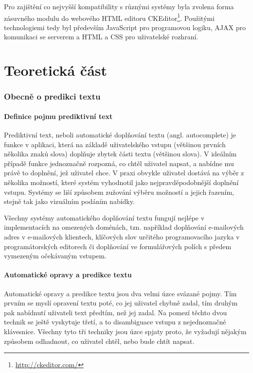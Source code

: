\documentclass[a4paper,11pt]{article}
\begin{document}
Pro zajištění co nejvyšší kompatibility s různými systémy byla zvolena forma zásuvného modulu do webového HTML editoru CKEditor\footnote{\url{http://ckeditor.com/}}. Použitými technologiemi tedy byl především JavaScript pro programovou logiku, AJAX pro komunikaci se serverem a HTML a CSS pro uživatelské rozhraní.

\newpage

\part{Teoretická část}

\section{Obecně o predikci textu}

\subsection{Definice pojmu prediktivní text}

Prediktivní text, neboli automatické doplňování textu (angl. autocomplete) je funkce v aplikaci, která na základě uživatelského vstupu (většinou prvních několika znaků slova) doplňuje zbytek části textu (většinou slova). V ideálním případě funkce jednoznačně rozpozná, co chtěl uživatel napsat, a nabídne mu právě to doplnění, jež uživatel chce. V praxi obvykle uživatel dostává na výběr z několika možností, které systém vyhodnotil jako nejpravděpodobnější doplnění vstupu. Systémy se liší způsobem zužování výběru možností a jejich řazením, stejně tak jako vizuálním podáním nabídky.

Všechny systémy automatického doplňování textu fungují nejlépe v implementacích na omezených doménách, tzn. například doplňování e-mailových adres v e-mailových klientech, klíčových slov určitého programovacího jazyka v programátorských editorech či doplňování ve formulářových polích s předem vymezeným očekávaným vstupem. 

\subsection{Automatické opravy a predikce textu}

Automatické opravy a predikce textu jsou dva velmi úzce svázané pojmy. Tím prvním se myslí opravení textu poté, co jej uživatel chybně zadal, tím druhým pak nabídnutí uživateli text předtím, než jej zadal. Na pomezí těchto dvou technik se ještě vyskytuje třetí, a to disambiguace vstupu z nejednoznačné klávesnice. Všechny tyto tři techniky jsou úzce spjaty proto, že vyžadují nějakým způsobem odhadnout, co uživatel chtěl, nebo bude chtít napsat.
\end{document}

